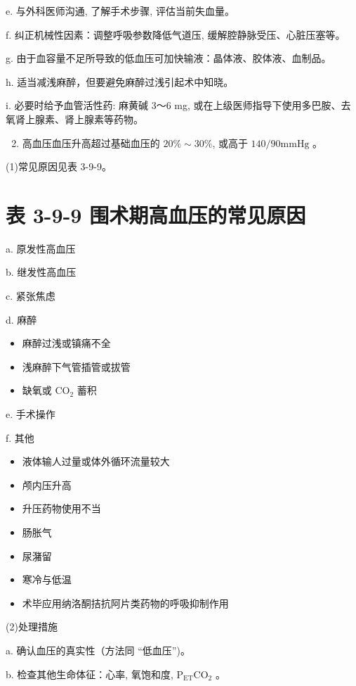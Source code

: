 \documentclass[10pt]{article}
\begin{document}
e. 与外科医师沟通, 了解手术步骤, 评估当前失血量。

f. 纠正机械性因素：调整呼吸参数降低气道压, 缓解腔静脉受压、心脏压塞等。

g. 由于血容量不足所导致的低血压可加快输液：晶体液、胶体液、血制品。

h. 适当减浅麻醉，但要避免麻醉过浅引起术中知晓。

i. 必要时给予血管活性药: 麻黄碱 3～6 mg, 或在上级医师指导下使用多巴胺、去氧肾上腺素、肾上腺素等药物。

\begin{enumerate}
  \setcounter{enumi}{1}
  \item 高血压血压升高超过基础血压的 $20 \% \sim 30 \%$, 或高于 $140 / 90 \mathrm{mmHg}$ 。
\end{enumerate}

(1)常见原因见表 3-9-9。

\section*{表 3-9-9 围术期高血压的常见原因}
a. 原发性高血压

b. 继发性高血压

c. 紧张焦虑

d. 麻醉

\begin{itemize}
  \item 麻醉过浅或镇痛不全
  \item 浅麻醉下气管插管或拔管
  \item 缺氧或 $\mathrm{CO}_{2}$ 蓄积
\end{itemize}

e. 手术操作

f. 其他

\begin{itemize}
  \item 液体输人过量或体外循环流量较大
  \item 颅内压升高
  \item 升压药物使用不当
  \item 肠胀气
  \item 尿潴留
  \item 寒冷与低温
  \item 术毕应用纳洛酮拮抗阿片类药物的呼吸抑制作用
\end{itemize}

(2)处理措施

a. 确认血压的真实性（方法同 “低血压”)。

b. 检查其他生命体征：心率, 氧饱和度, $\mathrm{P}_{\mathrm{ET}} \mathrm{CO}_{2}$ 。
\end{document}
